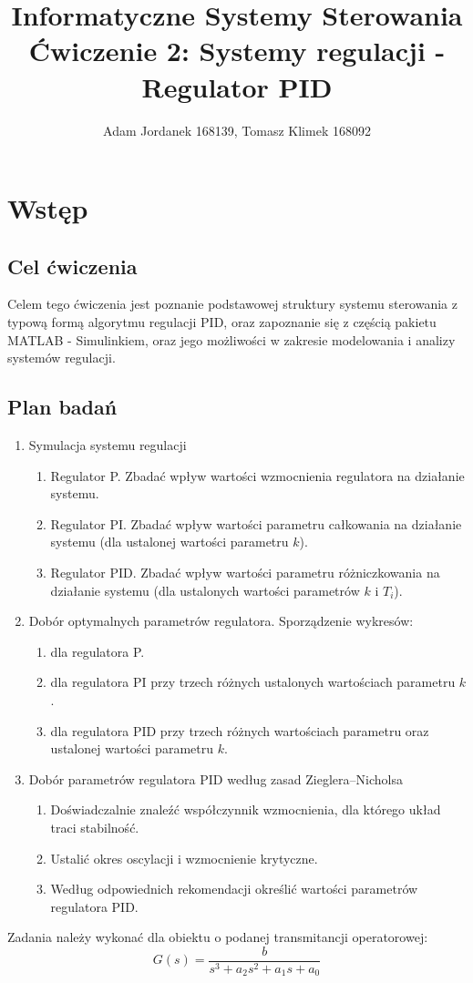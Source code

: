 \documentclass[a4paper,10pt]{article}
\title{Informatyczne Systemy Sterowania \\ \large Ćwiczenie 2: Systemy regulacji - Regulator PID}
\author{Adam Jordanek 168139, Tomasz Klimek 168092}
\begin{document}
\maketitle

\section{Wstęp}\label{sec:wstęp}
\subsection{Cel ćwiczenia}
Celem tego ćwiczenia jest poznanie podstawowej struktury systemu sterowania z typową formą algorytmu regulacji PID, oraz zapoznanie się z częścią pakietu M\small ATLAB \normalsize - Simulinkiem, oraz jego możliwości w zakresie modelowania i analizy systemów regulacji.

\subsection{Plan badań} 
\begin{enumerate}
	\item Symulacja systemu regulacji
	\begin{enumerate}
		\item Regulator P. Zbadać wpływ wartości wzmocnienia regulatora na działanie systemu. 
	    \item Regulator   PI.   Zbadać  wpływ   wartości   parametru   całkowania   na   działanie   systemu 
       (dla ustalonej wartości parametru $k$). 
    	\item Regulator PID. Zbadać wpływ wartości parametru różniczkowania na działanie 
       systemu (dla ustalonych wartości parametrów $k$ i $T_i$). 
	\end{enumerate}
	\item Dobór optymalnych parametrów regulatora. Sporządzenie wykresów:
	\begin{enumerate}
		\item dla regulatora P. 
    	\item dla regulatora PI przy trzech różnych ustalonych wartościach parametru $k$.  
    	\item dla regulatora PID przy trzech różnych wartościach parametru oraz ustalonej wartości parametru $k$.
	\end{enumerate}
	\item Dobór parametrów regulatora PID według zasad Zieglera–Nicholsa
	\begin{enumerate}
		\item Doświadczalnie znaleźć współczynnik wzmocnienia, dla którego układ traci stabilność.
		\item Ustalić okres oscylacji i wzmocnienie krytyczne.
		\item Według odpowiednich rekomendacji określić wartości parametrów regulatora PID.
	\end{enumerate}
\end{enumerate}
Zadania należy wykonać dla obiektu o podanej transmitancji operatorowej:
\begin{equation} \label{eqn:transOS}
	G(s) = \frac{b}{s^3 + a_2 s^2 + a_1 s + a_0}
\end{equation}
\end{document}
